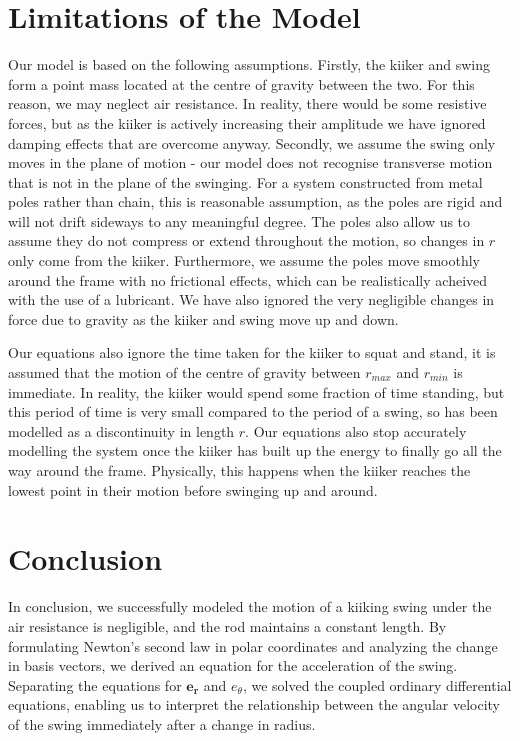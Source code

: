 \documentclass[12pt]{article}
\begin{document}
\section{Limitations of the Model}

Our model is based on the following assumptions.
Firstly, the kiiker and swing form a point mass located at the centre of gravity between the two. For this reason, we may neglect air resistance. In reality, there would be some resistive forces, but as the kiiker is actively increasing their amplitude we have ignored damping effects that are overcome anyway.
Secondly, we assume the swing only moves in the plane of motion - our model does not recognise transverse motion that is not in the plane of the swinging. For a system constructed from metal poles rather than chain, this is reasonable assumption, as the poles are rigid and will not drift sideways to any meaningful degree. The poles also allow us to assume they do not compress or extend throughout the motion, so changes in $r$ only come from the kiiker. Furthermore, we assume the poles move smoothly around the frame with no frictional effects, which can be realistically acheived with the use of a lubricant. We have also ignored the very negligible changes in force due to gravity as the kiiker and swing move up and down.

Our equations also ignore the time taken for the kiiker to squat and stand, it is assumed that the motion of the centre of gravity between $r_{max}$ and $r_{min}$ is immediate. In reality, the kiiker would spend some fraction of time standing, but this period of time is very small compared to the period of a swing, so has been modelled as a discontinuity in length $r$.
Our equations also stop accurately modelling the system once the kiiker has built up the energy to finally go all the way around the frame. Physically, this happens when the kiiker reaches the lowest point in their motion before swinging up and around.

\section{Conclusion}
In conclusion, we successfully modeled the motion of a kiiking swing under the air resistance is negligible, and the rod maintains a constant length. By formulating Newton’s second law in polar coordinates and analyzing the change in basis vectors, we derived an equation for the acceleration of the swing. Separating the equations for \(\mathbf{e_r}\) and \(e_{\theta}\), we solved the coupled ordinary differential equations, enabling us to interpret the relationship between the angular velocity of the swing immediately after a change in radius.  
\end{document}
